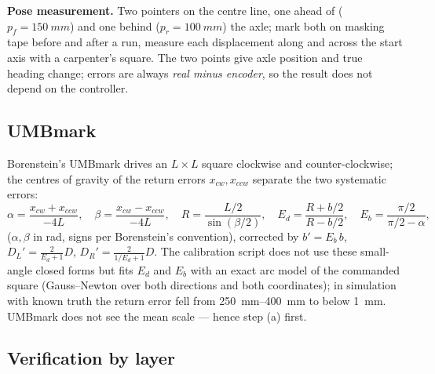 \documentclass[11pt,a4paper]{article}
\begin{document}
\textbf{Pose measurement.} Two pointers on the centre line, one ahead of
($p_f=\qty{150}{mm}$) and one behind ($p_r=\qty{100}{mm}$) the axle; mark both on
masking tape before and after a run, measure each displacement along and across
the start axis with a carpenter's square. The two points give axle position and
true heading change; errors are always \emph{real minus encoder}, so the result
does not depend on the controller.

\subsection{UMBmark}\label{sec:umbmark}

Borenstein's UMBmark drives an $L\times L$ square clockwise and
counter-clockwise; the centres of gravity of the return errors
$x_{cw},x_{ccw}$ separate the two systematic errors:
\begin{equation}
\alpha=\frac{x_{cw}+x_{ccw}}{-4L},\quad
\beta=\frac{x_{cw}-x_{ccw}}{-4L},\quad
R=\frac{L/2}{\sin(\beta/2)},\quad
E_d=\frac{R+b/2}{R-b/2},\quad
E_b=\frac{\pi/2}{\pi/2-\alpha},
\end{equation}
($\alpha,\beta$ in rad, signs per Borenstein's convention), corrected by
$b'=E_b\,b$, $D_L'=\tfrac{2}{E_d+1}D$, $D_R'=\tfrac{2}{1/E_d+1}D$. The calibration
script does not use these small-angle closed forms but fits $E_d$ and $E_b$ with
an exact arc model of the commanded square (Gauss--Newton over both directions
and both coordinates); in simulation with known truth the return error fell from
\qtyrange{250}{400}{mm} to below \qty{1}{mm}. UMBmark does not see the mean scale
--- hence step (a) first.

\subsection{Verification by layer}
\end{document}
